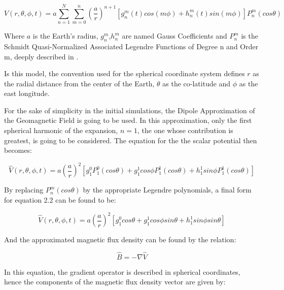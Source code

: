 \begin{equation}
	V(r,\theta,\phi,t) = a \sum_{n=1}^{N} \sum_{m=0}^n\left(  \frac{a}{r}\right)^{n+1}\left[g_{n}^{m}\left(t\right)cos\left(m\phi\right) + h_{n}^{m}\left(t\right)sin\left(m\phi\right)\right]P_{n}^{m}\left(cos\theta\right)
\end{equation} 

\indent
Where $a$ is the Earth's radius, $g_{n}^{m}$,$h_{n}^m$ are named Gauss Coefficients and $P_{n}^{m}$ is the Schmidt Quasi-Normalized Associated Legendre Functions of Degree n and Order m, deeply described in \cite{DW}.

\indent
Is this model, the convention used for the spherical coordinate system defines $r$ as the radial distance from the center of the Earth, $\theta$ as the co-latitude and $\phi$ as the east longitude.

\indent 
For the sake of simplicity in the initial simulations, the Dipole Approximation of the Geomagnetic Field is going to be used. In this approximation, only the first spherical harmonic of the expansion, $n=1$, the one whose contribution is greatest, is going to be considered. The equation for the the scalar potential then becomes:

\begin{equation}
	\hat{V}(r,\theta,\phi,t) = a \left(  \frac{a}{r} \right)^{2} \left[ g_{1}^0 P_{1}^{0} \left(cos\theta \right) + g_{1}^{1} cos \phi P_{1}^1 \left(cos\theta \right) + h_{1}^1 sin \phi P_{1}^1 \left(cos\theta \right)\right]  
\end{equation}

\indent
By replacing $P_{n}^{m} \left( cos\theta \right)$ by the appropriate Legendre polynomials, a final form for equation 2.2 can be found to be:

\begin{equation}
	\hat{V}(r,\theta,\phi,t) = a \left(  \frac{a}{r}\right)^{2} \left[ g_{1}^0cos\theta + g_{1}^{1}cos \phi sin \theta + h_{1}^1 sin \phi sin \theta \right]  
\end{equation}

\indent 
And the approximated magnetic flux density can be found by the relation: 

\begin{equation}
	\hat{B} = - \nabla \hat{V}
\end{equation}

\indent
In this equation, the gradient operator is described in spherical coordinates, hence the components of the magnetic flux density vector are given by:

